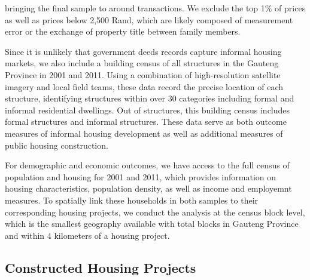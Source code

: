 \documentclass[12pt]{article}
\begin{document}
bringing the final sample to around  transactions.  We exclude the top 1\% of prices as well as prices below 2,500 Rand, which are likely composed of measurement error or the exchange of property title between family members.

Since it is unlikely that government deeds records capture informal housing markets, we also include a building census of all structures in the Gauteng Province in 2001 and 2011.  Using a combination of high-resolution satellite imagery and local field teams, these data record the precise location of each structure, identifying structures within over 30 categories including formal and informal residential dwellings.  Out of structures, this building census includes formal structures and informal structures.  These data serve as both outcome measures of informal housing development as well as additional measures of public housing construction.

For demographic and economic outcomes, we have access to the full census of population and housing for 2001 and 2011, which provides information on housing characteristics, population density, as well as income and employemnt measures.   To spatially link these households in both samples to their corresponding housing projects, we conduct the analysis at the census block level, which is the smallest geography available with total blocks in Gauteng Province and within 4 kilometers of a housing project.



\subsection{Constructed Housing Projects}

\end{document}
